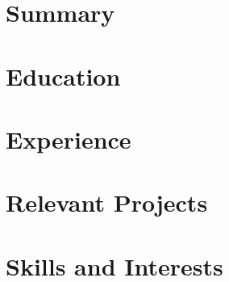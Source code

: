 \documentclass[letterpaper,10pt]{article}
\begin{document}


\vspace{-6mm} %
\section{Summary}


\vspace{-3mm} %
\section{Education}


\vspace{-3.5mm} %
\section{Experience}
\resumeSubHeadingListStart

      
      
      

  \resumeSubHeadingListEnd

  \vspace{-4.1mm} %

\section{Relevant Projects}
    \resumeSubHeadingListStart

     
     
     
     
     
     

    \resumeSubHeadingListEnd
  \vspace{-5mm} %

\section{Skills and Interests}

    
\end{document}
